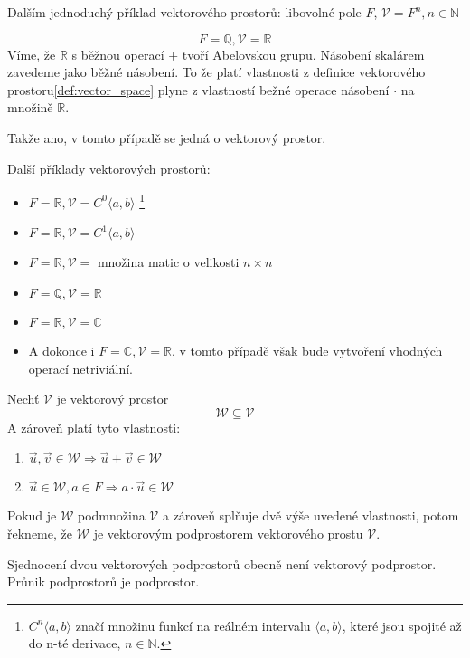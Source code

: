 Dalším jednoduchý příklad vektorového prostorů:
libovolné pole $F$, $\mathcal{V} = F^n, n \in \mathbb{N}$

\begin{example}
    $$F = \mathbb{Q}, \mathcal{V} = \mathbb{R}$$
    Víme, že $\mathbb{R}$ s běžnou operací $+$ tvoří Abelovskou grupu.
    Násobení skalárem zavedeme jako běžné násobení.
    To že platí vlastnosti z definice vektorového prostoru\ref{def:vector_space}
    plyne z vlastností bežné operace násobení $\cdot$ na množině $\mathbb{R}$.

    Takže ano, v tomto případě se jedná o vektorový prostor.
\end{example}

Další příklady vektorových prostorů:
\begin{itemize}
    \item $F = \mathbb{R}, \mathcal{V} = C^0\langle a, b \rangle$
        \footnote{$C^n\langle a,b \rangle$ značí množinu funkcí na reálném intervalu
        $\langle a,b \rangle$, které jsou spojité až do n-té derivace, $n \in \mathbb{N}$.}
    \item $F = \mathbb{R}, \mathcal{V} = C^1\langle a, b \rangle$
    \item $F = \mathbb{R}, \mathcal{V}=$ množina matic o velikosti $n \times n$
    \item $F = \mathbb{Q}, \mathcal{V} = \mathbb{R}$
    \item $F = \mathbb{R}, \mathcal{V} = \mathbb{C}$
    \item A dokonce i $F = \mathbb{C}, \mathcal{V} = \mathbb{R}$, v tomto případě však bude
        vytvoření vhodných operací netriviální.
\end{itemize}

\begin{definition}
    Nechť $\mathcal{V}$ je vektorový prostor
    $$\mathcal{W} \subseteq \mathcal{V}$$
    A zároveň platí tyto vlastnosti:
    \begin{enumerate}
        \item $\vec{u}, \vec{v} \in \mathcal{W} \Rightarrow \vec{u} + \vec{v} \in \mathcal{W}$
        \item $\vec{u} \in \mathcal{W}, a \in F \Rightarrow  a \cdot \vec{u} \in \mathcal{W}$
    \end{enumerate}

    Pokud je $\mathcal{W}$ podmnožina $\mathcal{V}$ a zároveň splňuje dvě výše uvedené vlastnosti,
    potom řekneme, že $\mathcal{W}$ je vektorovým podprostorem vektorového prostu $\mathcal{V}$.

    Sjednocení dvou vektorových podprostorů obecně není vektorový podprostor.
    Průnik podprostorů je podprostor.
\end{definition}

